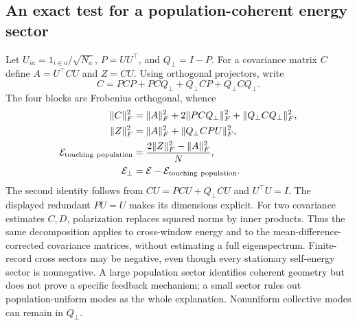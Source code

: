 \subsection{An exact test for a population-coherent energy sector}
Let $U_{ia}=1_{i\in a}/\sqrt{N_a}$, $P=UU^\top$, and $Q_\perp=I-P$.
For a covariance matrix $C$ define $A=U^\top CU$ and $Z=CU$.
Using orthogonal projectors, write
\begin{equation}
 C=PCP+PCQ_\perp+Q_\perp CP+Q_\perp CQ_\perp.
\end{equation}
The four blocks are Frobenius orthogonal, whence
\begin{align}
 \|C\|_F^2
 &=\|A\|_F^2+2\|PCQ_\perp\|_F^2
                     +\|Q_\perp CQ_\perp\|_F^2,\\
 \|Z\|_F^2&=\|A\|_F^2+\|Q_\perp CPU\|_F^2,\\
 \mathcal E_{\rm touching\ population}
 &=\frac{2\|Z\|_F^2-\|A\|_F^2}{N},\\
 \mathcal E_\perp
 &=\mathcal E-\mathcal E_{\rm touching\ population}.
\end{align}
The second identity follows from $CU=PCU+Q_\perp CU$ and $U^\top U=I$.
The displayed redundant $P U=U$ makes its dimensions explicit.
For two covariance estimates $C,D$, polarization replaces squared norms by
inner products. Thus the same decomposition applies to cross-window energy
and to the mean-difference-corrected covariance matrices, without estimating
a full eigenspectrum. Finite-record cross sectors may be negative, even
though every stationary self-energy sector is nonnegative.
A large population sector identifies coherent geometry but does not prove a
specific feedback mechanism; a small sector rules out population-uniform
modes as the whole explanation. Nonuniform collective modes can remain in
$Q_\perp$.

